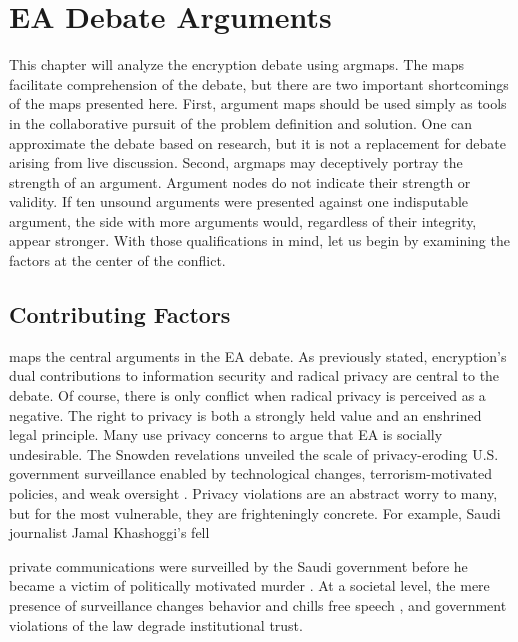 \chapter{EA Debate Arguments}
\label{chap-arguments}

This chapter will analyze the \ac{encryption} debate using \acp{argmap}. The maps facilitate comprehension of the
debate, but there are two important shortcomings of the maps presented here. First, argument maps should be used simply
as tools in the collaborative pursuit of the problem definition and solution. One can approximate the debate based on
research, but it is not a replacement for debate arising from live discussion. Second, \acp{argmap} may deceptively
portray the strength of an argument. Argument nodes do not indicate their strength or validity. If ten unsound arguments
were presented against one indisputable argument, the side with more arguments would, regardless of their integrity,
appear stronger. With those qualifications in mind, let us begin by examining the factors at the center of the conflict.


\section{Contributing Factors}
\label{sed-arg-contrib}

 maps the central arguments in the EA debate. As previously stated, \ac{encryption}'s dual
contributions to information security and radical privacy are central to the debate. Of course, there is only conflict
when radical privacy is perceived as a negative. The right to privacy is both a strongly held value and an enshrined
legal principle. Many use privacy concerns to argue that \ac{EA} is socially undesirable. The Snowden revelations
\cite{landau_making_2013} unveiled the scale of privacy-eroding U.S. government surveillance enabled by technological
changes, terrorism-motivated policies, and weak oversight \cite{shamsi_2011}. Privacy violations are an abstract worry
to many, but for the most vulnerable, they are frighteningly concrete. For example, Saudi journalist Jamal Khashoggi's
fell

private communications were surveilled by the Saudi government before he became a victim of politically motivated murder
\cite{liebermann_2019}. At a societal level, the mere presence of surveillance changes behavior and chills free speech
\cite{rogaway_moral_2015}, and government violations of the law degrade institutional trust.

